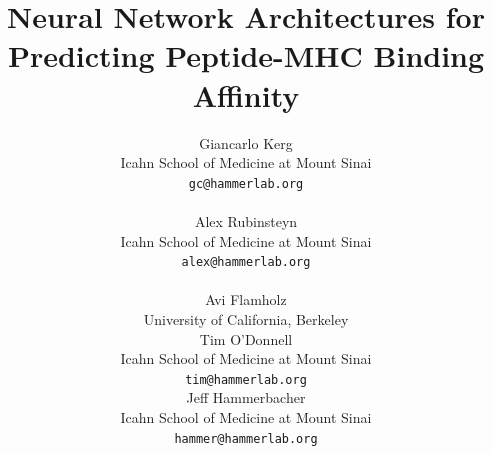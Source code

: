 \documentclass{article} %
\begin{document}
\title{Neural Network Architectures for Predicting Peptide-MHC Binding Affinity}

\author{
Giancarlo Kerg\\
Icahn School of Medicine at Mount Sinai \\
\texttt{gc@hammerlab.org} \\
\And

Alex Rubinsteyn\\
Icahn School of Medicine at Mount Sinai \\
\texttt{alex@hammerlab.org} \\
\And 

Avi Flamholz\\
University of California, Berkeley\\

\And
Tim O'Donnell \\
Icahn School of Medicine at Mount Sinai \\
\texttt{tim@hammerlab.org} \\

\And
Jeff Hammerbacher \\
Icahn School of Medicine at Mount Sinai  \\
\texttt{hammer@hammerlab.org}
}

\maketitle 
\vspace{-0.3cm}



\end{document}
